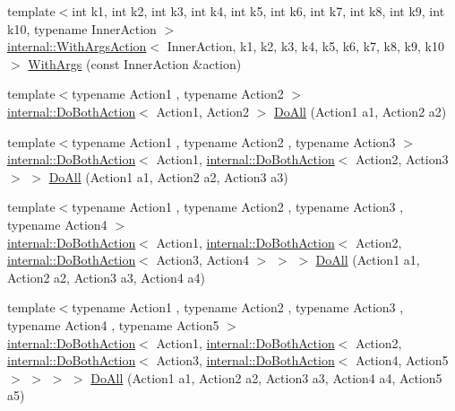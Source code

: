 \begin{DoxyCompactItemize}
\item 
{\footnotesize template$<$int k1, int k2, int k3, int k4, int k5, int k6, int k7, int k8, int k9, int k10, typename Inner\+Action $>$ }\\\hyperlink{classtesting_1_1internal_1_1_with_args_action}{internal\+::\+With\+Args\+Action}$<$ Inner\+Action, k1, k2, k3, k4, k5, k6, k7, k8, k9, k10 $>$ \hyperlink{namespacetesting_a768a620ad07c6b5822201fa4f15fb4f0}{With\+Args} (const Inner\+Action \&action)
\item 
{\footnotesize template$<$typename Action1 , typename Action2 $>$ }\\\hyperlink{classtesting_1_1internal_1_1_do_both_action}{internal\+::\+Do\+Both\+Action}$<$ Action1, Action2 $>$ \hyperlink{namespacetesting_a5f533932753d2af95000e96c4a3042e3}{Do\+All} (Action1 a1, Action2 a2)
\item 
{\footnotesize template$<$typename Action1 , typename Action2 , typename Action3 $>$ }\\\hyperlink{classtesting_1_1internal_1_1_do_both_action}{internal\+::\+Do\+Both\+Action}$<$ Action1, \hyperlink{classtesting_1_1internal_1_1_do_both_action}{internal\+::\+Do\+Both\+Action}$<$ Action2, Action3 $>$ $>$ \hyperlink{namespacetesting_ad6a3ce5e229120ea287286a86394d712}{Do\+All} (Action1 a1, Action2 a2, Action3 a3)
\item 
{\footnotesize template$<$typename Action1 , typename Action2 , typename Action3 , typename Action4 $>$ }\\\hyperlink{classtesting_1_1internal_1_1_do_both_action}{internal\+::\+Do\+Both\+Action}$<$ Action1, \hyperlink{classtesting_1_1internal_1_1_do_both_action}{internal\+::\+Do\+Both\+Action}$<$ Action2, \hyperlink{classtesting_1_1internal_1_1_do_both_action}{internal\+::\+Do\+Both\+Action}$<$ Action3, Action4 $>$ $>$ $>$ \hyperlink{namespacetesting_a790ce08c80a1f8ececa0f2a4f678247c}{Do\+All} (Action1 a1, Action2 a2, Action3 a3, Action4 a4)
\item 
{\footnotesize template$<$typename Action1 , typename Action2 , typename Action3 , typename Action4 , typename Action5 $>$ }\\\hyperlink{classtesting_1_1internal_1_1_do_both_action}{internal\+::\+Do\+Both\+Action}$<$ Action1, \hyperlink{classtesting_1_1internal_1_1_do_both_action}{internal\+::\+Do\+Both\+Action}$<$ Action2, \hyperlink{classtesting_1_1internal_1_1_do_both_action}{internal\+::\+Do\+Both\+Action}$<$ Action3, \hyperlink{classtesting_1_1internal_1_1_do_both_action}{internal\+::\+Do\+Both\+Action}$<$ Action4, Action5 $>$ $>$ $>$ $>$ \hyperlink{namespacetesting_a794c41d43373d7af9cebbc7f1c5e4a57}{Do\+All} (Action1 a1, Action2 a2, Action3 a3, Action4 a4, Action5 a5)

\end{DoxyCompactItemize}
